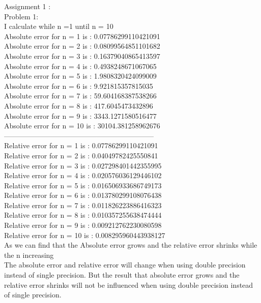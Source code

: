 \documentclass{article}
\begin{document}
Assignment 1 :\\
Problem 1:\\
I calculate while n =1 until n = 10\\
Absolute error for n = 1 is : 0.07786299110421091\\
Absolute error for n = 2 is : 0.08099564851101682\\
Absolute error for n = 3 is : 0.16379040865413597\\
Absolute error for n = 4 is : 0.4938248671067065\\
Absolute error for n = 5 is : 1.9808320424099009\\
Absolute error for n = 6 is : 9.921815357815035\\
Absolute error for n = 7 is : 59.604168387538266\\
Absolute error for n = 8 is : 417.6045473432896\\
Absolute error for n = 9 is : 3343.1271580516477\\
Absolute error for n = 10 is : 30104.381258962676\\
---------------------------------------------------------------\\
Relative error for n = 1 is : 0.07786299110421091\\
Relative error for n = 2 is : 0.04049782425550841\\
Relative error for n = 3 is : 0.027298401442355995\\
Relative error for n = 4 is : 0.020576036129446102\\
Relative error for n = 5 is : 0.016506933686749173\\
Relative error for n = 6 is : 0.013780299108076438\\
Relative error for n = 7 is : 0.011826223886416323\\
Relative error for n = 8 is : 0.010357255638474444\\
Relative error for n = 9 is : 0.009212762230080598\\
Relative error for n = 10 is : 0.008295960443938127\\
As we can find that the Absolute error grows and the relative error shrinks while the n increasing\\
The absolute error and relative error will change when using double precision instead of single precision.
But the result that absolute error grows and the relative error shrinks will not be influenced when using double precision instead of single precision.\\
\\
\end{document}
